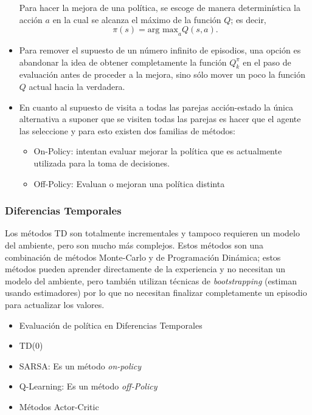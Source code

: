 \documentclass[11pt]{article}
\theoremstyle{plain}
\begin{document}
\begin{itemize}
Para hacer la mejora de una política, se escoge de manera determinística la acción $a$ en la cual se alcanza el máximo de la función $Q$; es decir,
\[ \pi(s) = \textrm{arg max}_a Q(s,a).\]
\item Para remover el supuesto de un número infinito de episodios, una opción es abandonar la idea de obtener completamente la función $Q^\pi_k$ en el paso de evaluación antes de proceder a la mejora, sino sólo mover un poco la función $Q$ actual hacia la verdadera.
\item En cuanto al supuesto de visita a todas las parejas acción-estado la única alternativa a suponer que se visiten todas las parejas es hacer que el agente las seleccione y para esto existen dos familias de métodos:
		\begin{itemize}
				\item On-Policy: intentan evaluar mejorar la política que es actualmente utilizada para la toma de decisiones.
				\item Off-Policy: Evaluan o mejoran una política distinta
		\end{itemize}
\end{itemize}
\subsubsection{Diferencias Temporales}
Los métodos TD son totalmente incrementales y tampoco requieren un modelo del ambiente, pero son mucho más complejos. Estos métodos son una combinación de métodos Monte-Carlo y de Programación Dinámica; estos métodos pueden aprender directamente de la experiencia y no necesitan un modelo del ambiente, pero también utilizan técnicas de \textit{bootstrapping} (estiman usando estimadores) por lo que no necesitan finalizar completamente un episodio para actualizar los valores.
\begin{itemize}
\item Evaluación de política en Diferencias Temporales
\item TD(0)
\item SARSA: Es un método \textit{on-policy}
\item Q-Learning: Es un método \textit{off-Policy}
\item Métodos Actor-Critic
\end{itemize}
\end{document}
